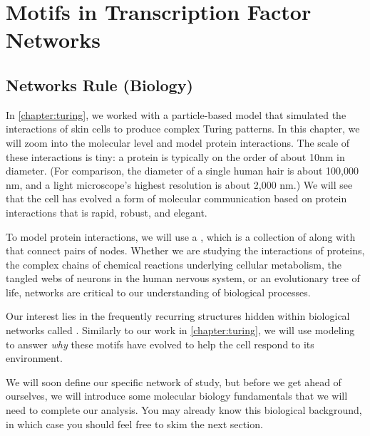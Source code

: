 \chapter[Motifs in Transcription Factor Networks]{Motifs in Transcription Factor Networks}
\label{chapter:motifs}
\renewcommand{\chaptertitle}{Motifs in Transcription Factor Networks}


\FloatBarrier

\section{Networks Rule (Biology)}
\label{sec:introduction}

In \autoref{chapter:turing}, we worked with a particle-based model that simulated the interactions of skin cells to produce complex Turing patterns. In this chapter, we will zoom into the molecular level and model protein interactions. The scale of these interactions is tiny: a protein is typically on the order of about 10nm in diameter. (For comparison, the diameter of a single human hair is about 100,000 nm, and a light microscope's highest resolution is about 2,000 nm.) We will see that the cell has evolved a form of molecular communication based on protein interactions that is rapid, robust, and elegant.

To model protein interactions, we will use a  , which is a collection of  along with  that connect pairs of nodes. Whether we are studying the interactions of proteins, the complex chains of chemical reactions underlying cellular metabolism, the tangled webs of neurons in the human nervous system, or an evolutionary tree of life, networks are critical to our understanding of biological processes.

Our interest lies in the frequently recurring structures hidden within biological networks called . Similarly to our work in \autoref{chapter:turing}, we will use modeling to answer \textit{why} these motifs have evolved to help the cell respond to its environment.

We will soon define our specific network of study, but before we get ahead of ourselves, we will introduce some molecular biology fundamentals that we will need to complete our analysis. You may already know this biological background, in which case you should feel free to skim the next section.\\

